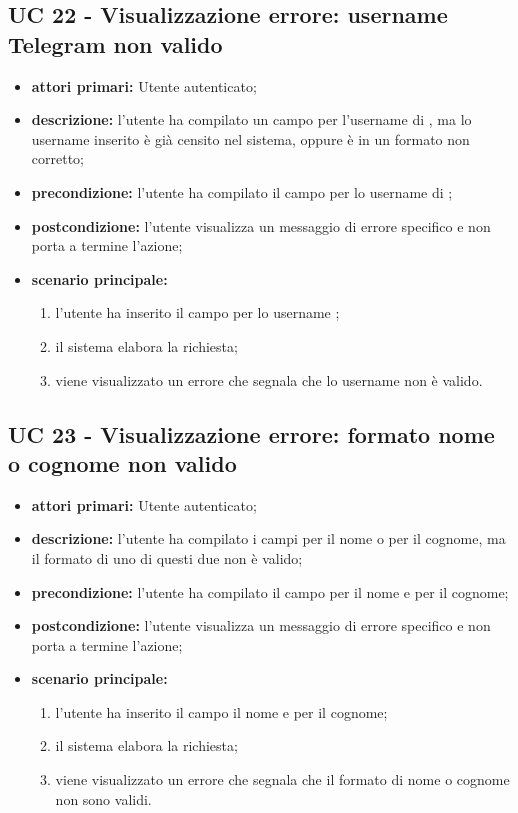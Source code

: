 
		\subsection{UC 22 - Visualizzazione errore: username Telegram non valido}
		\begin{itemize}
			\item \textbf{attori primari:} Utente autenticato;
			\item \textbf{descrizione:} l'utente ha compilato un campo per l'username di , ma lo username inserito è già censito nel sistema, oppure è in un formato non corretto;
			\item \textbf{precondizione:} l'utente ha compilato il campo per lo username di ;
			\item \textbf{postcondizione:} l'utente visualizza un messaggio di errore specifico e non porta a termine l'azione;
			\item \textbf{scenario principale:}
			\begin{enumerate}
				\item l'utente ha inserito il campo per lo username ;
				\item il sistema elabora la richiesta;
				\item viene visualizzato un errore che segnala che lo username  non è valido.
			\end{enumerate}
		\end{itemize}



		\subsection{UC 23 - Visualizzazione errore: formato nome o cognome non valido}
		\begin{itemize}
			\item \textbf{attori primari:} Utente autenticato;
			\item \textbf{descrizione:} l'utente ha compilato i campi per il nome o per il cognome, ma il formato di uno di questi due non è valido;
			\item \textbf{precondizione:} l'utente ha compilato il campo per il nome e per il cognome;
			\item \textbf{postcondizione:} l'utente visualizza un messaggio di errore specifico e non porta a termine l'azione;
			\item \textbf{scenario principale:}
			\begin{enumerate}
				\item l'utente ha inserito il campo il nome e per il cognome;
				\item il sistema elabora la richiesta;
				\item viene visualizzato un errore che segnala che il formato di nome o cognome non sono validi.
			\end{enumerate}
		\end{itemize}